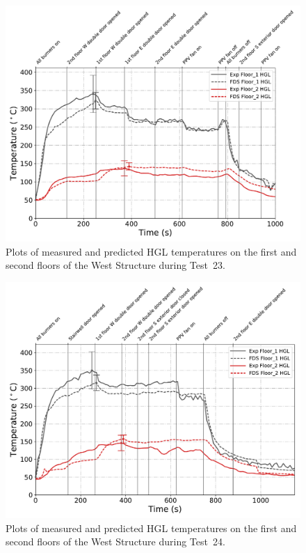 \begin{figure}[!h]
	\centering
	\includegraphics[width=\columnwidth]{Figures/Plots/Validation/Temperature/Test_23_HGL}
	\caption[Plots of measured and predicted HGL temperatures during Test~23.]{Plots of measured and predicted HGL temperatures on the first and second floors of the West Structure during Test~23.}
	\label{fig:HGL_data_Test23}
\end{figure}

\begin{figure}[!h]
	\centering
	\includegraphics[width=\columnwidth]{Figures/Plots/Validation/Temperature/Test_24_HGL}
	\caption[Plots of measured and predicted HGL temperatures during Test~24.]{Plots of measured and predicted HGL temperatures on the first and second floors of the West Structure during Test~24.}
	\label{fig:HGL_data_Test24}
\end{figure}

